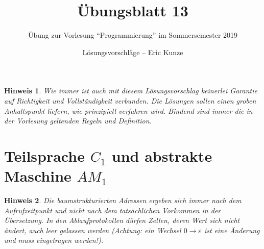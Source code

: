 \documentclass[ngerman,a4paper, 11pt]{scrartcl}
\title{\Huge Übungsblatt 13}
\subtitle{Übung zur Vorlesung ``Programmierung'' im Sommersemester 2019}
\date{}
\author{Lösungsvorschläge -- Eric Kunze}
\renewcommand{\epsilon}{\varepsilon}
\theoremstyle{break}
\theoremstyle{nonumberplain}
\newtheorem{hint}{Hinweis}
\begin{document}
		
\maketitle

\begin{hint}
	Wie immer ist auch mit diesem Lösungsvorschlag keinerlei Garantie auf Richtigkeit und Vollständigkeit verbunden. Die Lösungen sollen einen groben Anhaltspunkt liefern, wie prinzipiell verfahren wird. Bindend sind immer die in der Vorlesung geltenden Regeln und Definition.
\end{hint}

\section{Teilsprache $C_1$ und abstrakte Maschine $AM_1$}

\begin{hint}
	Die baumstrukturierten Adressen ergeben sich immer nach dem Aufrufzeitpunkt und nicht nach dem tatsächlichen Vorkommen in der Übersetzung. In den Ablaufprotokollen dürfen Zellen, deren Wert sich nicht ändert, auch leer gelassen werden (Achtung: ein Wechsel $0 \to \epsilon$ ist eine Änderung und muss eingetragen werden!). 
\end{hint}
\end{document}
